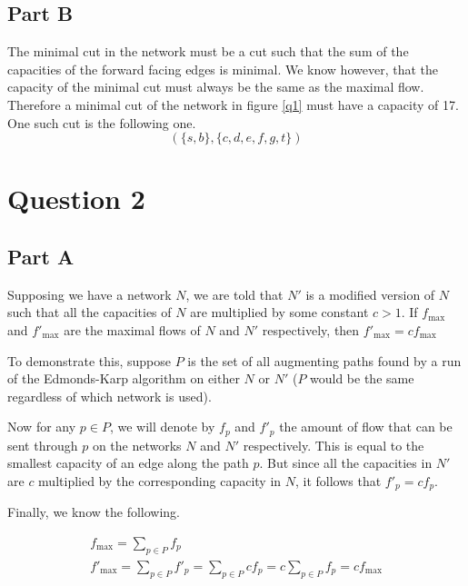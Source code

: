 \documentclass{article}
\begin{document}
\subsection*{Part B}

The minimal cut in the network must be a cut such that the sum of the capacities of the forward facing edges is minimal. We know however, that the capacity of the minimal cut must always be the same as the maximal flow. Therefore a minimal cut of the network in figure \ref{q1} must have a capacity of 17. One such cut is the following one.
\begin{equation*}
	(\{s, b\}, \{c, d, e, f, g, t\})
\end{equation*}

\section*{Question 2}

\subsection*{Part A}

Supposing we have a network \(N\), we are told that \(N'\) is a modified version of \(N\) such that all the capacities of \(N\) are multiplied by some constant \(c > 1\). If \(f_{\max}\) and \(f'_{\max}\) are the maximal flows of \(N\) and \(N'\) respectively, then \(f'_{\max} = cf_{\max}\)

To demonstrate this, suppose \(P\) is the set of all augmenting paths found by a run of the Edmonds-Karp algorithm on either \(N\) or \(N'\) (\(P\) would be the same regardless of which network is used).

Now for any \(p \in P\), we will denote by \(f_p\) and \(f'_p\) the amount of flow that can be sent through \(p\) on the networks \(N\) and \(N'\) respectively. This is equal to the smallest capacity of an edge along the path \(p\). But since all the capacities in \(N'\) are \(c\) multiplied by the corresponding capacity in \(N\), it follows that \(f'_p = cf_p\).

Finally, we know the following.

\begin{gather*}
	f_{\max} = \sum_{p \in P} f_p \\
	f'_{\max} = \sum_{p \in P} f'_p = \sum_{p \in P} cf_p = c \sum_{p \in P} f_p = cf_{\max} \\
\end{gather*}
\end{document}

